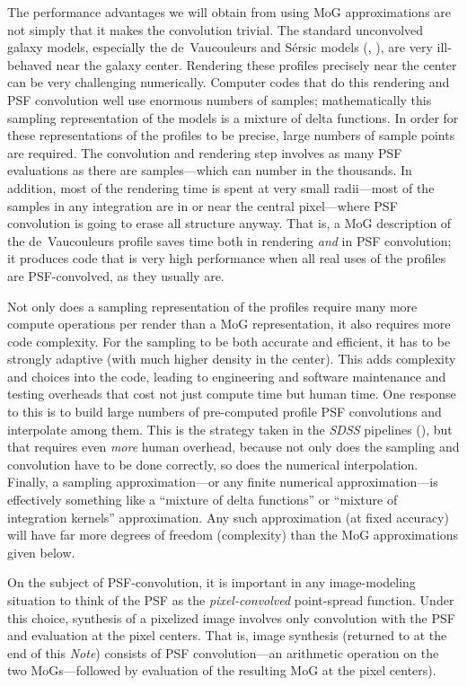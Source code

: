 \documentclass[12pt,pdftex,preprint]{aastex}
\newcommand{\documentname}{\textsl{Note}}
\newcommand{\project}[1]{\textsl{#1}}
\begin{document}
The performance advantages we will obtain from using MoG
approximations are not simply that it makes the convolution trivial.
The standard unconvolved galaxy models, especially the de~Vaucouleurs
and S\'ersic models (\citealt{dev}, \citealt{ser}), are very
ill-behaved near the galaxy center.  Rendering these profiles
precisely near the center can be very challenging numerically.
Computer codes that do this rendering and PSF convolution well use
enormous numbers of samples; mathematically this sampling
representation of the models is a mixture of delta functions.  In
order for these representations of the profiles to be precise, large
numbers of sample points are required.  The convolution and rendering
step involves as many PSF evaluations as there are samples---which can
number in the thousands.  In addition, most of the rendering time is
spent at very small radii---most of the samples in any integration are
in or near the central pixel---where PSF convolution is going to erase
all structure anyway.  That is, a MoG description of the
de~Vaucouleurs profile saves time both in rendering \emph{and} in PSF
convolution; it produces code that is very high performance when all
real uses of the profiles are PSF-convolved, as they usually are.

Not only does a sampling representation of the profiles require many
more compute operations per render than a MoG representation, it also
requires more code complexity.  For the sampling to be both accurate
and efficient, it has to be strongly adaptive (with much higher
density in the center).  This adds complexity and choices into the
code, leading to engineering and software maintenance and testing
overheads that cost not just compute time but human time.  One
response to this is to build large numbers of pre-computed profile PSF
convolutions and interpolate among them.  This is the strategy taken
in the \project{SDSS} pipelines (\citealt{lupton}), but that requires
even \emph{more} human overhead, because not only does the sampling
and convolution have to be done correctly, so does the numerical
interpolation.  Finally, a sampling approximation---or any finite
numerical approximation---is effectively something like a ``mixture of
delta functions'' or ``mixture of integration kernels'' approximation.
Any such approximation (at fixed accuracy) will have far more degrees
of freedom (complexity) than the MoG approximations given below.

On the subject of PSF-convolution, it is important in any
image-modeling situation to think of the PSF as the
\emph{pixel-convolved} point-spread function.  Under this choice,
synthesis of a pixelized image involves only convolution with the PSF
and evaluation at the pixel centers.  That is, image synthesis
(returned to at the end of this \documentname) consists of PSF
convolution---an arithmetic operation on the two MoGs---followed by
evaluation of the resulting MoG at the pixel centers).
\end{document}
